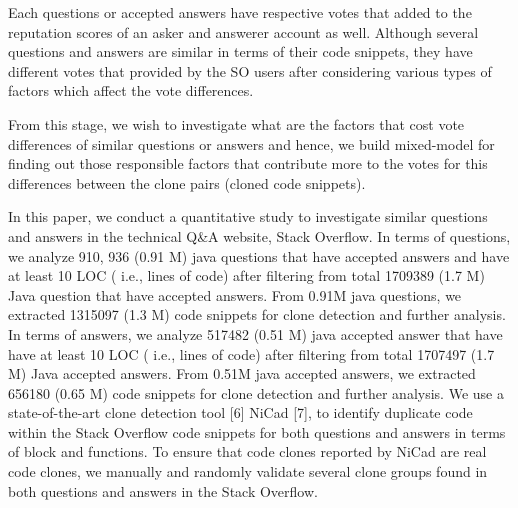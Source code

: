 \documentclass[conference]{IEEEtran}
\begin{document}
	Each questions or accepted answers have respective votes that added to the reputation scores of an asker and answerer account as well. Although several questions and answers are similar in terms of their code snippets, they have different votes that provided by the SO users after considering various types of factors which affect the vote differences. 
	
	From this stage, we wish to investigate what are the factors that cost vote differences of similar questions or answers and hence, we build mixed-model for finding out those responsible factors that contribute more to the votes for this differences between the clone pairs (cloned code snippets). 
	
	In this paper, we conduct a quantitative study to investigate similar questions and answers in the technical Q\&A website, Stack Overflow. In terms of questions, we analyze 910, 936 (0.91 M) java questions that have accepted answers and have at least 10 LOC ( i.e., lines of code) after filtering from total 1709389 (1.7 M) Java question that have accepted answers. From 0.91M java questions, we extracted 1315097 (1.3 M) code snippets for clone detection and further analysis. In terms of answers, we analyze 517482 (0.51 M) java accepted answer that have have at least 10 LOC ( i.e., lines of code) after filtering from total 1707497 (1.7 M) Java accepted answers. From 0.51M java accepted answers, we extracted 656180 (0.65 M) code snippets for clone detection and further analysis. We use a state-of-the-art clone detection tool [6] NiCad [7], to identify duplicate code within the Stack Overflow code snippets for both questions and answers in terms of block and functions. To ensure that code clones reported by NiCad are real code clones, we manually and randomly validate several clone groups found in both questions and answers in the Stack Overflow. 
	
\end{document}
